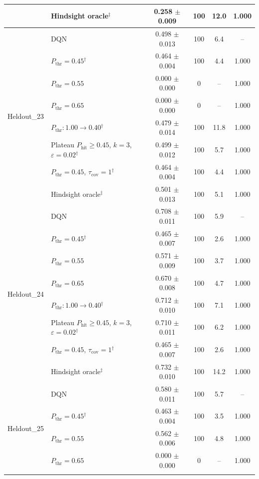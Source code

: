 \begin{table}[htbp]
\begin{tabular}{llcccc}
 & Hindsight oracle$^{\ddagger}$ & 0.258 $\pm$ 0.009 & 100 & 12.0 & 1.000 \\
\midrule
\multirow{8}{*}{Heldout\_23} & DQN & 0.498 $\pm$ 0.013 & 100 & 6.4 & -- \\
 & $P_{\mathrm{thr}}=0.45$$^{\dagger}$ & 0.464 $\pm$ 0.004 & 100 & 4.4 & 1.000 \\
 & $P_{\mathrm{thr}}=0.55$ & 0.000 $\pm$ 0.000 & 0 & -- & 1.000 \\
 & $P_{\mathrm{thr}}=0.65$ & 0.000 $\pm$ 0.000 & 0 & -- & 1.000 \\
 & $P_{\mathrm{thr}}: 1.00 \to 0.40$$^{\dagger}$ & 0.479 $\pm$ 0.014 & 100 & 11.8 & 1.000 \\
 & Plateau $P_{\mathrm{hit}}\geq0.45$, $k=3$, $\varepsilon=0.02$$^{\dagger}$ & 0.499 $\pm$ 0.012 & 100 & 5.7 & 1.000 \\
 & $P_{\mathrm{thr}}=0.45$, $\tau_{\mathrm{cov}}=1$$^{\dagger}$ & 0.464 $\pm$ 0.004 & 100 & 4.4 & 1.000 \\
 & Hindsight oracle$^{\ddagger}$ & 0.501 $\pm$ 0.013 & 100 & 5.1 & 1.000 \\
\midrule
\multirow{8}{*}{Heldout\_24} & DQN & 0.708 $\pm$ 0.011 & 100 & 5.9 & -- \\
 & $P_{\mathrm{thr}}=0.45$$^{\dagger}$ & 0.465 $\pm$ 0.007 & 100 & 2.6 & 1.000 \\
 & $P_{\mathrm{thr}}=0.55$ & 0.571 $\pm$ 0.009 & 100 & 3.7 & 1.000 \\
 & $P_{\mathrm{thr}}=0.65$ & 0.670 $\pm$ 0.008 & 100 & 4.7 & 1.000 \\
 & $P_{\mathrm{thr}}: 1.00 \to 0.40$$^{\dagger}$ & 0.712 $\pm$ 0.010 & 100 & 7.1 & 1.000 \\
 & Plateau $P_{\mathrm{hit}}\geq0.45$, $k=3$, $\varepsilon=0.02$$^{\dagger}$ & 0.710 $\pm$ 0.011 & 100 & 6.2 & 1.000 \\
 & $P_{\mathrm{thr}}=0.45$, $\tau_{\mathrm{cov}}=1$$^{\dagger}$ & 0.465 $\pm$ 0.007 & 100 & 2.6 & 1.000 \\
 & Hindsight oracle$^{\ddagger}$ & 0.732 $\pm$ 0.010 & 100 & 14.2 & 1.000 \\
\midrule
\multirow{8}{*}{Heldout\_25} & DQN & 0.580 $\pm$ 0.011 & 100 & 5.7 & -- \\
 & $P_{\mathrm{thr}}=0.45$$^{\dagger}$ & 0.463 $\pm$ 0.004 & 100 & 3.5 & 1.000 \\
 & $P_{\mathrm{thr}}=0.55$ & 0.562 $\pm$ 0.006 & 100 & 4.8 & 1.000 \\
 & $P_{\mathrm{thr}}=0.65$ & 0.000 $\pm$ 0.000 & 0 & -- & 1.000 \\
$$
\end{tabular}
\end{table}
